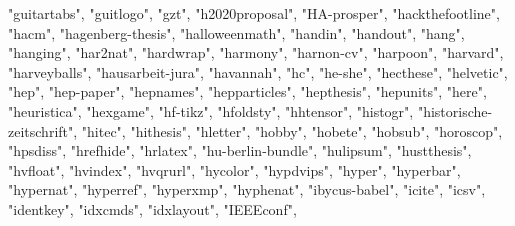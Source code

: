 \documentclass[
]{article}
\newenvironment{Shaded}{\begin{snugshade}}{\end{snugshade}}
\newcommand{\NormalTok}[1]{#1}
\newcommand{\StringTok}[1]{\textcolor[rgb]{0.31,0.60,0.02}{#1}}
\begin{document}
\begin{Shaded}
\begin{Highlighting}[]
\StringTok{"guitartabs"}\NormalTok{, }\StringTok{"guitlogo"}\NormalTok{, }\StringTok{"gzt"}\NormalTok{, }\StringTok{"h2020proposal"}\NormalTok{, }\StringTok{"HA{-}prosper"}\NormalTok{, }
\StringTok{"hackthefootline"}\NormalTok{, }\StringTok{"hacm"}\NormalTok{, }\StringTok{"hagenberg{-}thesis"}\NormalTok{, }\StringTok{"halloweenmath"}\NormalTok{, }
\StringTok{"handin"}\NormalTok{, }\StringTok{"handout"}\NormalTok{, }\StringTok{"hang"}\NormalTok{, }\StringTok{"hanging"}\NormalTok{, }\StringTok{"har2nat"}\NormalTok{, }\StringTok{"hardwrap"}\NormalTok{, }
\StringTok{"harmony"}\NormalTok{, }\StringTok{"harnon{-}cv"}\NormalTok{, }\StringTok{"harpoon"}\NormalTok{, }\StringTok{"harvard"}\NormalTok{, }\StringTok{"harveyballs"}\NormalTok{, }
\StringTok{"hausarbeit{-}jura"}\NormalTok{, }\StringTok{"havannah"}\NormalTok{, }\StringTok{"hc"}\NormalTok{, }\StringTok{"he{-}she"}\NormalTok{, }\StringTok{"hecthese"}\NormalTok{, }\StringTok{"helvetic"}\NormalTok{, }
\StringTok{"hep"}\NormalTok{, }\StringTok{"hep{-}paper"}\NormalTok{, }\StringTok{"hepnames"}\NormalTok{, }\StringTok{"hepparticles"}\NormalTok{, }\StringTok{"hepthesis"}\NormalTok{, }
\StringTok{"hepunits"}\NormalTok{, }\StringTok{"here"}\NormalTok{, }\StringTok{"heuristica"}\NormalTok{, }\StringTok{"hexgame"}\NormalTok{, }\StringTok{"hf{-}tikz"}\NormalTok{, }\StringTok{"hfoldsty"}\NormalTok{, }
\StringTok{"hhtensor"}\NormalTok{, }\StringTok{"histogr"}\NormalTok{, }\StringTok{"historische{-}zeitschrift"}\NormalTok{, }\StringTok{"hitec"}\NormalTok{, }\StringTok{"hithesis"}\NormalTok{, }
\StringTok{"hletter"}\NormalTok{, }\StringTok{"hobby"}\NormalTok{, }\StringTok{"hobete"}\NormalTok{, }\StringTok{"hobsub"}\NormalTok{, }\StringTok{"horoscop"}\NormalTok{, }\StringTok{"hpsdiss"}\NormalTok{, }
\StringTok{"hrefhide"}\NormalTok{, }\StringTok{"hrlatex"}\NormalTok{, }\StringTok{"hu{-}berlin{-}bundle"}\NormalTok{, }\StringTok{"hulipsum"}\NormalTok{, }\StringTok{"hustthesis"}\NormalTok{, }
\StringTok{"hvfloat"}\NormalTok{, }\StringTok{"hvindex"}\NormalTok{, }\StringTok{"hvqrurl"}\NormalTok{, }\StringTok{"hycolor"}\NormalTok{, }\StringTok{"hypdvips"}\NormalTok{, }\StringTok{"hyper"}\NormalTok{, }
\StringTok{"hyperbar"}\NormalTok{, }\StringTok{"hypernat"}\NormalTok{, }\StringTok{"hyperref"}\NormalTok{, }\StringTok{"hyperxmp"}\NormalTok{, }\StringTok{"hyphenat"}\NormalTok{, }\StringTok{"ibycus{-}babel"}\NormalTok{, }
\StringTok{"icite"}\NormalTok{, }\StringTok{"icsv"}\NormalTok{, }\StringTok{"identkey"}\NormalTok{, }\StringTok{"idxcmds"}\NormalTok{, }\StringTok{"idxlayout"}\NormalTok{, }\StringTok{"IEEEconf"}\NormalTok{, }

\end{Highlighting}
\end{Shaded}
\end{document}

